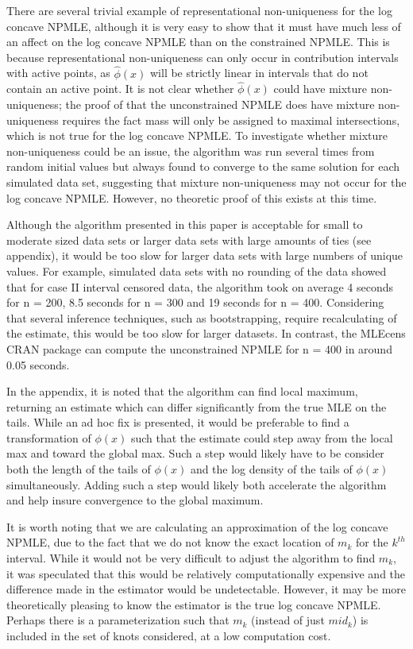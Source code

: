 \documentclass[10pt]{article}
\begin{document}
	There are several trivial example of representational non-uniqueness for the log concave NPMLE, although it is very easy to show that it must have much less of an affect on the log concave NPMLE than on the constrained NPMLE. This is because representational non-uniqueness can only occur in contribution intervals with active points, as $\hat \phi(x)$ will be strictly linear in intervals that do not contain an active point. It is not clear whether $\hat \phi(x)$ could have mixture non-uniqueness; the proof of that the unconstrained NPMLE does have mixture non-uniqueness requires the fact mass will only be assigned to maximal intersections, which is not true for the log concave NPMLE. To investigate whether mixture non-uniqueness could be an issue, the algorithm was run several times from random initial values but always found to converge to the same solution for each simulated data set, suggesting that mixture non-uniqueness may not occur for the log concave NPMLE. However, no theoretic proof of this exists at this time.
	
	Although the algorithm presented in this paper is acceptable for small to moderate sized data sets or larger data sets with large amounts of ties (see appendix), it would be too slow for larger data sets with large numbers of unique values. For example, simulated data sets with no rounding of the data showed that for case II interval censored data, the algorithm took on average 4 seconds for n = 200, 8.5 seconds for n = 300 and 19 seconds for n = 400. Considering that several inference techniques, such as bootstrapping, require recalculating of the estimate, this would be too slow for larger datasets. In contrast, the MLEcens CRAN package can compute the unconstrained NPMLE for n = 400 in around 0.05 seconds. 
	
	In the appendix, it is noted that the algorithm can find local maximum, returning an estimate which can differ significantly from the true MLE on the tails. While an ad hoc fix is presented, it would be preferable to find a transformation of $\phi(x)$ such that the estimate could step away from the local max and toward the global max. Such a step would likely have to be consider both the length of the tails of $\phi(x)$ and the log density of the tails of $\phi(x)$ simultaneously. Adding such a step would likely both accelerate the algorithm and help insure convergence to the global maximum.  
	
	It is worth noting that we are calculating an approximation of the log concave NPMLE, due to the fact that we do not know the exact location of $m_k$ for the $k^{th}$ interval. While it would not be very difficult to adjust the algorithm to find $m_k$, it was speculated that this would be relatively computationally expensive and the difference made in the estimator would be undetectable.  However, it may be more theoretically pleasing to know the estimator is the true log concave NPMLE. Perhaps there is a parameterization such that $m_k$ (instead of just $mid_k$) is included in the set of knots considered, at a low computation cost.
	
\end{document}
